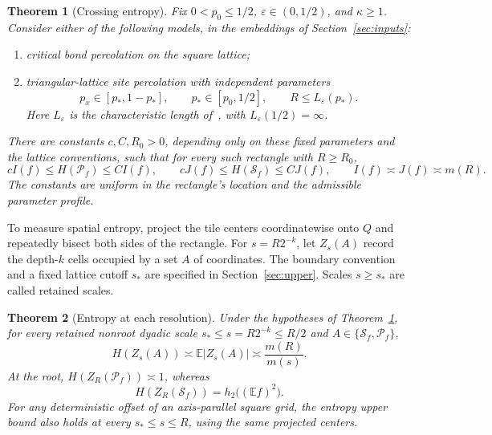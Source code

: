\documentclass[11pt]{amsart}
\newtheorem{theorem}{Theorem}[section]
\theoremstyle{remark}
\newcommand{\E}{\mathbb E}
\newcommand{\cS}{\mathcal S}
\newcommand{\cP}{\mathcal P}
\begin{document}
\begin{theorem}[Crossing entropy]\label{thm:main}
Fix $0<p_0\le1/2$, $\varepsilon\in(0,1/2)$, and $\kappa\ge1$.
Consider either of the following models, in the embeddings of
Section~\ref{sec:inputs}:
\begin{enumerate}[label=(\roman*)]
\item critical bond percolation on the square lattice;
\item triangular-lattice site percolation with independent parameters
\[
 p_x\in[p_*,1-p_*],\qquad p_*\in[p_0,1/2],\qquad
 R\le L_\varepsilon(p_*).
\]
Here $L_\varepsilon$ is the characteristic length
of~\cite[Section~3.1]{Nolin}, with $L_\varepsilon(1/2)=\infty$.
\end{enumerate}
There are constants $c,C,R_0>0$, depending only on these fixed
parameters and the lattice conventions, such that for every such
rectangle with $R\ge R_0$,
\begin{equation}\label{eq:mainentropy}
 cI(f)\le H(\cP_f)\le CI(f),\qquad
 cJ(f)\le H(\cS_f)\le CJ(f),\qquad
 I(f)\asymp J(f)\asymp m(R).
\end{equation}
The constants are uniform in the rectangle's location and the
admissible parameter profile.
\end{theorem}

To measure spatial entropy, project the tile centers coordinatewise
onto $Q$ and repeatedly bisect both sides of the rectangle. For
$s=R2^{-k}$, let $Z_s(A)$ record the depth-$k$ cells occupied by a set
$A$ of coordinates. The boundary convention and a fixed lattice
cutoff $s_*$ are specified in Section~\ref{sec:upper}. Scales
$s\ge s_*$ are called retained scales.

\begin{theorem}[Entropy at each resolution]\label{thm:scales}
Under the hypotheses of Theorem~\ref{thm:main}, for every retained
nonroot dyadic scale $s_*\le s=R2^{-k}\le R/2$ and
$A\in\{\cS_f,\cP_f\}$,
\begin{equation}\label{eq:maincoarse}
 H(Z_s(A))\asymp\E|Z_s(A)|\asymp\frac{m(R)}{m(s)}.
\end{equation}
At the root, $H(Z_R(\cP_f))\asymp1$, whereas
\begin{equation}\label{eq:rootexact}
 H(Z_R(\cS_f))=h_2\bigl((\E f)^2\bigr).
\end{equation}
For any deterministic offset of an axis-parallel square grid, the
entropy upper bound also holds at every $s_*\le s\le R$, using the
same projected centers.
\end{theorem}
\end{document}
